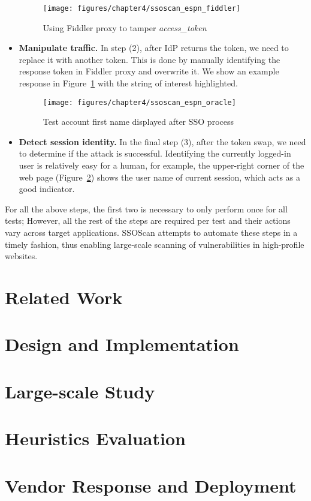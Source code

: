 \begin{itemize}
\begin{figure}[hbt]
\centering
\texttt{[image: figures/chapter4/ssoscan\_espn\_fiddler]}
\caption{Using Fiddler proxy to tamper \emph{access\_token}}
\label{fig:ssoscan_espn_fiddler}
\end{figure}

\item \textbf{Manipulate traffic.} In step (2), after IdP returns the token, we need to replace it with another token.  This is done by manually identifying the response token in Fiddler proxy and overwrite it.  We show an example response in Figure~\ref{fig:ssoscan_espn_fiddler} with the string of interest highlighted.

\begin{figure}[hbt]
\centering
\texttt{[image: figures/chapter4/ssoscan\_espn\_oracle]}
\caption{Test account first name displayed after SSO process}
\label{fig:ssoscan_espn_oracle}
\end{figure}

\item \textbf{Detect session identity.}  In the final step (3), after the token swap, we need to determine if the attack is successful.  Identifying the currently logged-in user is relatively easy for a human, for example, the upper-right corner of the web page (Figure~\ref{fig:ssoscan_espn_oracle}) shows the user name of current session, which acts as a good indicator.

\end{itemize}

For all the above steps, the first two is necessary to only perform once for all tests;  However, all the rest of the steps are required per test and their actions vary across target applications.  SSOScan attempts to automate these steps in a timely fashion, thus enabling large-scale scanning of vulnerabilities in high-profile websites.  

\section{Related Work}
\label{sec:ssoscan_related_work}
\section{Design and Implementation}
\label{sec:ssoscan_design}
\section{Large-scale Study}
\label{sec:ssoscan_study}
\section{Heuristics Evaluation}
\label{sec:ssoscan_heuristics}
\section{Vendor Response and Deployment}
\label{sec:ssoscan_deployment}